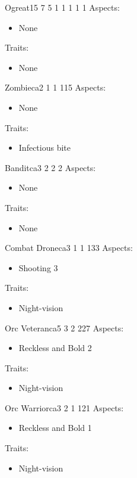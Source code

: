 \documentclass[11pt]{article}
\begin{document}
{\begin{npc}{Ogre}{at}{15 7 5 1 1 1 1 1}{}
Aspects:
\begin{itemize}
\item None
\end{itemize}
Traits:
\begin{itemize}
\item None
\end{itemize}
\end{npc}

\begin{npc}{Zombie}{ca}{2 1 1 1}{15}
Aspects:
\begin{itemize}
\item None
\end{itemize}
Traits:
\begin{itemize}
\item Infectious bite
\end{itemize}
\end{npc}

\begin{npc}{Bandit}{ca}{3 2 2 2}{}
Aspects:
\begin{itemize}
\item None
\end{itemize}
Traits:
\begin{itemize}
\item None
\end{itemize}
\end{npc}

\begin{npc}{Combat Drone}{ca}{3 1 1 1}{33}
Aspects:
\begin{itemize}
\item Shooting 3
\end{itemize}
Traits:
\begin{itemize}
\item Night-vision
\end{itemize}
\end{npc}

\begin{npc}{Orc Veteran}{ca}{5 3 2 2}{27}
Aspects:
\begin{itemize}
\item Reckless and Bold 2
\end{itemize}
Traits:
\begin{itemize}
\item Night-vision
\end{itemize}
\end{npc}

\begin{npc}{Orc Warrior}{ca}{3 2 1 1}{21}
Aspects:
\begin{itemize}
\item Reckless and Bold 1
\end{itemize}
Traits:
\begin{itemize}
\item Night-vision
\end{itemize}
\end{npc}

}
\end{document}
